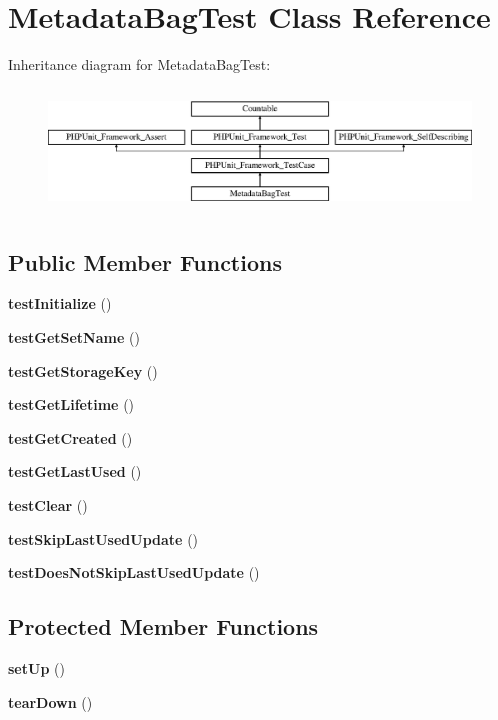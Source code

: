 \section{Metadata\+Bag\+Test Class Reference}
\label{class_symfony_1_1_component_1_1_http_foundation_1_1_tests_1_1_session_1_1_storage_1_1_metadata_bag_test}
Inheritance diagram for Metadata\+Bag\+Test\+:\begin{figure}[H]
\begin{center}
\leavevmode
\includegraphics[height=3.303835cm]{class_symfony_1_1_component_1_1_http_foundation_1_1_tests_1_1_session_1_1_storage_1_1_metadata_bag_test}
\end{center}
\end{figure}
\subsection*{Public Member Functions}
\begin{DoxyCompactItemize}
\item 
{\bf test\+Initialize} ()
\item 
{\bf test\+Get\+Set\+Name} ()
\item 
{\bf test\+Get\+Storage\+Key} ()
\item 
{\bf test\+Get\+Lifetime} ()
\item 
{\bf test\+Get\+Created} ()
\item 
{\bf test\+Get\+Last\+Used} ()
\item 
{\bf test\+Clear} ()
\item 
{\bf test\+Skip\+Last\+Used\+Update} ()
\item 
{\bf test\+Does\+Not\+Skip\+Last\+Used\+Update} ()
\end{DoxyCompactItemize}
\subsection*{Protected Member Functions}
\begin{DoxyCompactItemize}
\item 
{\bf set\+Up} ()
\item 
{\bf tear\+Down} ()
\end{DoxyCompactItemize}
